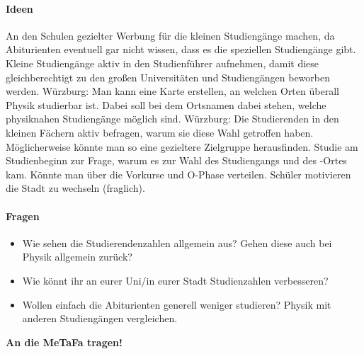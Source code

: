 		\paragraph{Ideen}
			\begin{outline}
				\1 An den Schulen gezielter Werbung für die kleinen Studiengänge machen, da Abiturienten eventuell gar nicht wissen, dass es die speziellen Studiengänge gibt.
			  \1 Kleine Studiengänge aktiv in den Studienführer aufnehmen, damit diese gleichberechtigt zu den großen Universitäten und Studiengängen beworben werden.
			  \1 Würzburg: Man kann eine Karte erstellen, an welchen Orten überall Physik studierbar ist. Dabei soll bei dem Ortsnamen dabei stehen, welche physiknahen Studiengänge möglich sind.
			  \1 Würzburg: Die Studierenden in den kleinen Fächern aktiv befragen, warum sie diese Wahl getroffen haben. Möglicherweise könnte man so eine gezieltere Zielgruppe herausfinden.
			  \1 Studie am Studienbeginn zur Frage, warum es zur Wahl des Studiengangs und des -Ortes kam.
			      \2 Könnte man über die Vorkurse und O-Phase verteilen.
			  \1 Schüler motivieren die Stadt zu wechseln (fraglich).
			\end{outline}

		\paragraph{Fragen}
			\begin{itemize}
				\item Wie sehen die Studierendenzahlen allgemein aus? Gehen diese auch bei Physik allgemein zurück?
			  \item Wie könnt ihr an eurer Uni/in eurer Stadt Studienzahlen verbesseren?
			  \item Wollen einfach die Abiturienten generell weniger studieren? Physik mit anderen Studiengängen vergleichen.
			\end{itemize}

		\textbf{An die MeTaFa tragen!}
